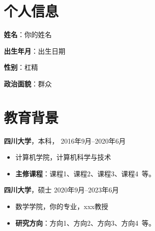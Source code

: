 \documentclass[11pt]{article}
\newlength{\iconwidth}
\begin{document}
    \begin{minipage}[t]{0.78\textwidth}
        \begin{minipage}[t]{\textwidth}
        \section[个人信息]{\makebox[\iconwidth][c]{\color{primary_color}{\faAddressCard}}\quad 个人信息}
        \begin{minipage}[t]{0.5\textwidth}
            \textbf{姓\qquad 名}：你的姓名
            
            \vspace{0.5em}
            \textbf{出生年月}：出生日期
        \end{minipage}
        \begin{minipage}[t]{0.35\textwidth}
            \textbf{性\qquad 别}：杠精
            
            \vspace{0.5em}
            \textbf{政治面貌}：群众
        \end{minipage}
        \vspace{1.2em}
        \end{minipage}

        \begin{minipage}[t]{\textwidth}
        \section[教育背景]{\makebox[\iconwidth][c]{\color{primary_color}{\faGraduationCap}}\quad 教育背景}
        
        {\large \textbf{四川大学}}，本科， \hfill 2016年9月--2020年6月
        \begin{itemize}
            \item 计算机学院，计算机科学与技术
            \item \textbf{主修课程}：课程1、课程2、课程3、课程4\ 等。
        \end{itemize}
        
        \vspace{0.5em}
        {\large \textbf{四川大学}}，硕士 \hfill 2020年9月--2023年6月
        \begin{itemize}
            \item 数学学院，你的专业，xxx教授
            \item \textbf{研究方向}：方向1、方向2、方向3、方向4\ 等。
        \end{itemize}
        

\end{minipage}
\end{minipage}
\end{document}
